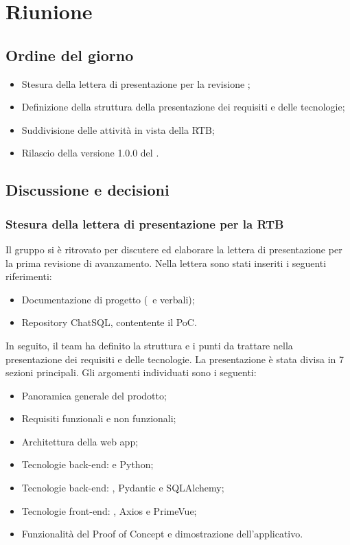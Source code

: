 \section{Riunione}
\subsection{Ordine del giorno}
\begin{itemize}
	\item Stesura della lettera di presentazione per la revisione ;
	\item Definizione della struttura della presentazione dei requisiti e delle tecnologie;
	\item Suddivisione delle attività in vista della RTB;
	\item Rilascio della versione 1.0.0 del .
\end{itemize}

\subsection{Discussione e decisioni}
\subsubsection{Stesura della lettera di presentazione per la RTB}
\par Il gruppo si è ritrovato per discutere ed elaborare la lettera di presentazione per la prima revisione di avanzamento. 
Nella lettera sono stati inseriti i seguenti riferimenti:
\begin{itemize}
	\item Documentazione di progetto (\AdR\ e verbali);
	\item Repository ChatSQL, contentente il PoC.
\end{itemize}

\vspace{0.5\baselineskip}
\par In seguito, il team ha definito la struttura e i punti da trattare nella presentazione dei requisiti e delle tecnologie. La presentazione è stata divisa in 7 sezioni principali. Gli argomenti individuati sono i seguenti:
\begin{itemize}
	\item Panoramica generale del prodotto;
	\item Requisiti funzionali e non funzionali;
	\item Architettura della web app; 
	\item Tecnologie back-end:  e Python;
	\item Tecnologie back-end: , Pydantic e SQLAlchemy;
	\item Tecnologie front-end: , Axios e PrimeVue;
	\item Funzionalità del Proof of Concept e dimostrazione dell'applicativo.
\end{itemize}

